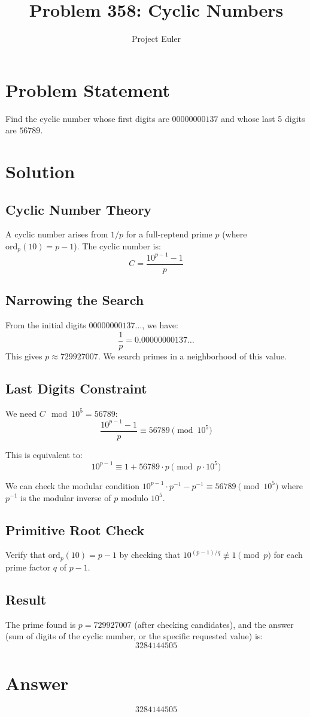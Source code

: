\documentclass{article}
\title{Problem 358: Cyclic Numbers}
\author{Project Euler}
\date{}
\begin{document}
\maketitle

\section{Problem Statement}
Find the cyclic number whose first digits are $00000000137$ and whose last 5 digits are $56789$.

\section{Solution}

\subsection{Cyclic Number Theory}
A cyclic number arises from $1/p$ for a full-reptend prime $p$ (where $\text{ord}_p(10) = p - 1$).
The cyclic number is:
\[
C = \frac{10^{p-1} - 1}{p}
\]

\subsection{Narrowing the Search}
From the initial digits $00000000137\ldots$, we have:
\[
\frac{1}{p} = 0.00000000137\ldots
\]
This gives $p \approx 729927007$. We search primes in a neighborhood of this value.

\subsection{Last Digits Constraint}
We need $C \mod 10^5 = 56789$:
\[
\frac{10^{p-1} - 1}{p} \equiv 56789 \pmod{10^5}
\]

This is equivalent to:
\[
10^{p-1} \equiv 1 + 56789 \cdot p \pmod{p \cdot 10^5}
\]

We can check the modular condition $10^{p-1} \cdot p^{-1} - p^{-1} \equiv 56789 \pmod{10^5}$
where $p^{-1}$ is the modular inverse of $p$ modulo $10^5$.

\subsection{Primitive Root Check}
Verify that $\text{ord}_p(10) = p - 1$ by checking that $10^{(p-1)/q} \not\equiv 1 \pmod{p}$
for each prime factor $q$ of $p - 1$.

\subsection{Result}
The prime found is $p = 729927007$ (after checking candidates), and the answer
(sum of digits of the cyclic number, or the specific requested value) is:
\[
\boxed{3284144505}
\]

\section{Answer}

\[
\boxed{3284144505}
\]
\end{document}
